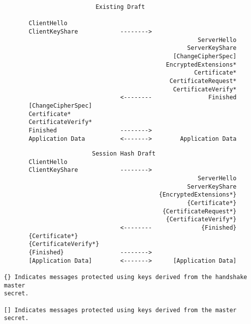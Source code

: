 \documentclass[helvetica]{seminar}
\begin{document}
\centerslidesfalse 

\begin{slide}
\begin{footnotesize}
\begin{verbatim}
                          Existing Draft

       ClientHello
       ClientKeyShare            -------->
                                                       ServerHello
                                                    ServerKeyShare
                                                [ChangeCipherSpec]
                                              EncryptedExtensions*
                                                      Certificate*
                                               CertificateRequest*
                                                CertificateVerify*
                                 <--------                Finished
       [ChangeCipherSpec]
       Certificate*
       CertificateVerify*
       Finished                  -------->
       Application Data          <------->        Application Data
\end{verbatim}
\end{footnotesize}
\end{slide}


\begin{slide}
\begin{footnotesize}
\vspace{-2ex}
\begin{verbatim}
                         Session Hash Draft
       ClientHello
       ClientKeyShare            -------->
                                                       ServerHello
                                                    ServerKeyShare
                                            {EncryptedExtensions*}
                                                    {Certificate*}
                                             {CertificateRequest*}
                                              {CertificateVerify*}
                                 <--------              {Finished}
       {Certificate*}
       {CertificateVerify*}
       {Finished}                -------->
       [Application Data]        <------->      [Application Data]

{} Indicates messages protected using keys derived from the handshake master
secret.

[] Indicates messages protected using keys derived from the master secret.

\end{verbatim}
\end{footnotesize}
\end{slide}
\end{document}
